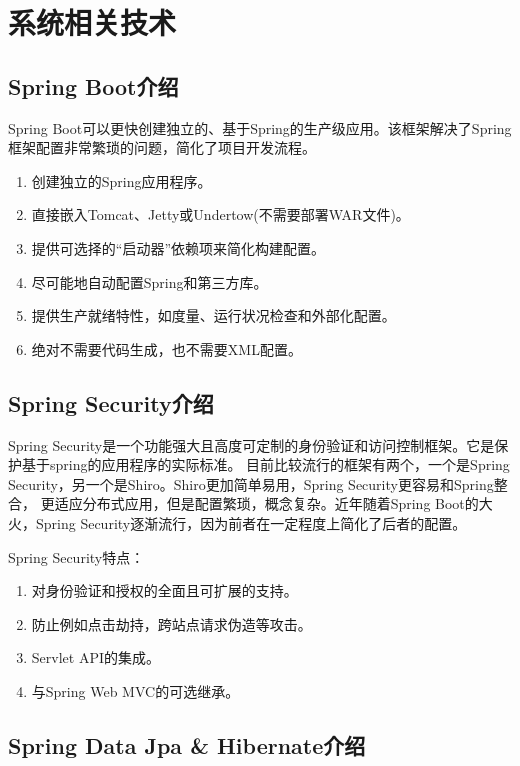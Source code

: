 
\chapter{系统相关技术}
\label{chap04}

\section{Spring Boot介绍}

Spring Boot可以更快创建独立的、基于Spring的生产级应用。该框架解决了Spring框架配置非常繁琐的问题，简化了项目开发流程\cite{.2019f}。

\begin{enumerate}
    \item 创建独立的Spring应用程序。
    \item 直接嵌入Tomcat、Jetty或Undertow(不需要部署WAR文件)。
    \item 提供可选择的“启动器”依赖项来简化构建配置。
    \item 尽可能地自动配置Spring和第三方库。
    \item 提供生产就绪特性，如度量、运行状况检查和外部化配置。
    \item 绝对不需要代码生成，也不需要XML配置。
\end{enumerate}

\section{Spring Security介绍}

Spring Security是一个功能强大且高度可定制的身份验证和访问控制框架。它是保护基于spring的应用程序的实际标准。
目前比较流行的框架有两个，一个是Spring Security，另一个是Shiro。Shiro更加简单易用，Spring Security更容易和Spring整合，
更适应分布式应用，但是配置繁琐，概念复杂。近年随着Spring Boot的大火，Spring Security逐渐流行，因为前者在一定程度上简化了后者的配置。

Spring Security特点：
\begin{enumerate}
    \item 对身份验证和授权的全面且可扩展的支持。
    \item 防止例如点击劫持，跨站点请求伪造等攻击。
    \item Servlet API的集成。
    \item 与Spring Web MVC的可选继承。
\end{enumerate}

\section{Spring Data Jpa \& Hibernate介绍}

